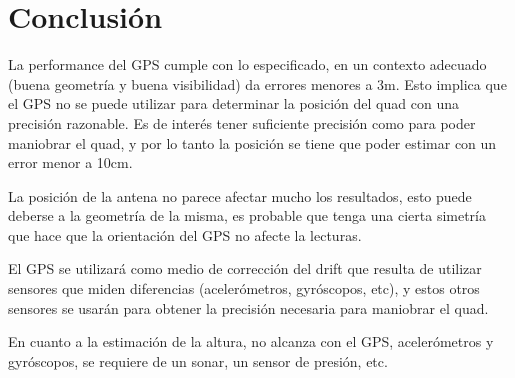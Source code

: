 \documentclass[spanish,12pt,a4paper,titlepage]{report}
\begin{document}

\newpage
\section{Conclusión}
\label{sec:conclusion}

La performance del GPS cumple con lo especificado, en un contexto adecuado (buena geometría y buena visibilidad) da errores menores a 3m. Esto implica que el GPS no se puede utilizar para determinar la posición del quad con una precisión razonable. Es de interés tener suficiente precisión como para poder maniobrar el quad, y por lo tanto la posición se tiene que poder estimar con un error menor a 10cm.

La posición de la antena no parece afectar mucho los resultados, esto puede deberse a la geometría de la misma, es probable que tenga una cierta simetría que hace que la orientación del GPS no afecte la lecturas.

El GPS se utilizará como medio de corrección del drift que resulta de utilizar sensores que miden diferencias (acelerómetros, gyróscopos, etc), y estos otros sensores se usarán para obtener la precisión necesaria para maniobrar el quad.

En cuanto a la estimación de la altura, no alcanza con el GPS, acelerómetros y gyróscopos, se requiere de un sonar, un sensor de presión, etc.
\end{document}
